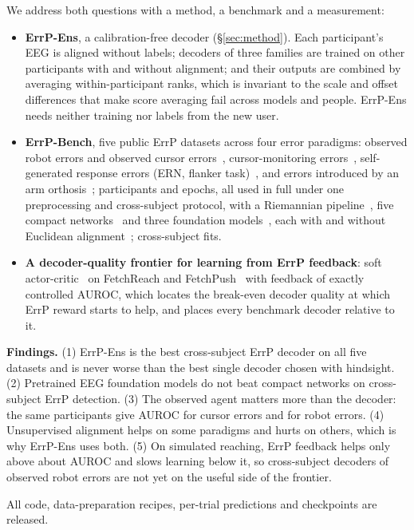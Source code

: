 We address both questions with a method, a benchmark and a measurement:
\begin{itemize}
\item \textbf{ErrP-Ens}, a calibration-free decoder (\S\ref{sec:method}). Each participant's EEG is aligned
  without labels; decoders of three families are trained on other participants with and without alignment; and
  their outputs are combined by averaging within-participant ranks, which is invariant to the scale and offset
  differences that make score averaging fail across models and people. ErrP-Ens needs neither training nor
  labels from the new user.
\item \textbf{ErrP-Bench}, five public ErrP datasets across four error paradigms: observed robot errors and
  observed cursor errors~\citep{ehrlich2019feasibility}, cursor-monitoring errors~\citep{chavarriaga2010learning},
  self-generated response errors (ERN, flanker task)~\citep{kappenman2021erpcore}, and errors introduced by an
  arm orthosis~\citep{kueper2024eegemg}; \NSubjectsTotal{} participants and \NEpochsTotal{} epochs, all used in
  full under one preprocessing and cross-subject protocol, with a Riemannian pipeline~\citep{rivet2009xdawn,barachant2012multiclass},
  five compact networks~\citep{lawhern2018eegnet,santamariavazquez2020eeginception,chen2024eegnex,song2023eegconformer,zhao2024ctnet}
  and three foundation models~\citep{jiang2024labram,wang2024eegpt,wang2025cbramod}, each with and without
  Euclidean alignment~\citep{he2020transfer}; \NFitsTotal{} cross-subject fits.
\item \textbf{A decoder-quality frontier for learning from ErrP feedback}: soft actor-critic~\citep{haarnoja2018sac}
  on FetchReach and FetchPush~\citep{plappert2018multigoal} with feedback of exactly controlled AUROC, which
  locates the break-even decoder quality at which ErrP reward starts to help, and places every benchmark decoder
  relative to it.
\end{itemize}

\textbf{Findings.} (1) ErrP-Ens is the best cross-subject ErrP decoder on all five datasets and is never worse
than the best single decoder chosen with hindsight. (2) Pretrained EEG foundation models do not beat compact
networks on cross-subject ErrP detection. (3) The observed agent matters more than the decoder: the same
participants give \BestErrpHriCursor{} AUROC for cursor errors and \BestErrpHriRobot{} for robot errors.
(4) Unsupervised alignment helps on some paradigms and hurts on others, which is why ErrP-Ens uses both.
(5) On simulated reaching, ErrP feedback helps only above about AUROC \RLBreakEvenReach{} and slows learning
below it, so cross-subject decoders of observed robot errors are not yet on the useful side of the frontier.

All code, data-preparation recipes, per-trial predictions and checkpoints are released.
